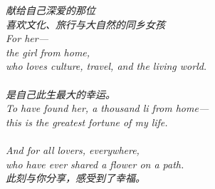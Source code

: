 
\begin{abstract}

\end{abstract}
\clearpage

\thispagestyle{empty}
\null\vfill
\begin{center}
\begin{minipage}{0.72\linewidth}
\centering\itshape\color{rose}
{\cjk 献给自己深爱的那位}\\[0.4em]
{\cjk 喜欢文化、旅行与大自然的同乡女孩}\\[0.8em]
\upshape\normalsize For her---\\[0.3em]
\itshape the girl from home,\\[0.2em]
who loves culture, travel, and the living world.\\[1.0em]
\\[0.2em]
{\cjk 是自己此生最大的幸运。}\\[0.6em]
\itshape To have found her, a thousand \emph{li} from home---\\[0.2em]
this is the greatest fortune of my life.\\[1.2em]
\\[0.3em]
\itshape And for all lovers, everywhere,\\[0.2em]
who have ever shared a flower on a path.\\[1.0em]
{\upshape\footnotesize\color{gold} {\cjk 此刻与你分享，感受到了幸福。}}
\end{minipage}
\end{center}
\vfill\null
\clearpage

